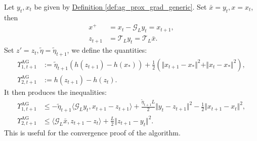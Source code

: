 \documentclass[12pt]{article}
\begin{document}
    \begin{remark}\label{remark:upsilon-upperbound-for-iterates}
        Let $y_t, x_t$ be given by
        \hyperref[def:ag_prox_grad_generic]
        {Definition \ref*{def:ag_prox_grad_generic}}.
        Set $\bar x = y_t, x = x_t$, then 
        \begin{align*}
            x^+ &= x_t - \mathcal G_L y_t = x_{t + 1},
            \\
            z_{t + 1} &= \mathcal T_L y_t = \mathcal T_L \bar x.
        \end{align*}
        Set $z' = z_t, \tilde \eta = \tilde \eta_{t + 1}$, we define the quantities: 
        \begin{align*}
            \Upsilon_{1, t + 1}^{\text{AG}}
            &:= 
            \tilde \eta_{t + 1}(h(z_{t + 1}) - h(x_*))
            + 
            \frac{1}{2}(\Vert x_{t + 1} - x_*\Vert^2 + \Vert x_t - x_*\Vert^2),
            \\
            \Upsilon_{2, t + 1}^{\text{AG}}
            &:= 
            h(z_{t + 1}) - h(z_t). 
        \end{align*}
        It then produces the inequalities: 
        \begin{align*}
            \Upsilon_{1, t + 1}^{\text{AG}}
            &\le 
            - \tilde \eta_{t + 1}\langle \mathcal G_L y_t, x_{t + 1} - z_{t + 1}\rangle
            + 
            \frac{\tilde \eta_{t + 1}L}{2}
            \Vert  
                y_t - z_{t + 1}
            \Vert^2
            - 
            \frac{1}{2}
            \Vert x_{t + 1} - x_t\Vert^2,  
            \\ 
            \Upsilon_{2, t + 1}^{\text{AG}}
            &\le 
            \langle \mathcal G_L \bar x, z_{t + 1} - z_t \rangle + 
            \frac{L}{2}\Vert z_{t + 1} - y_t\Vert^2.
        \end{align*}
        This is useful for the convergence proof of the algorithm. 
    \end{remark}
\end{document}
